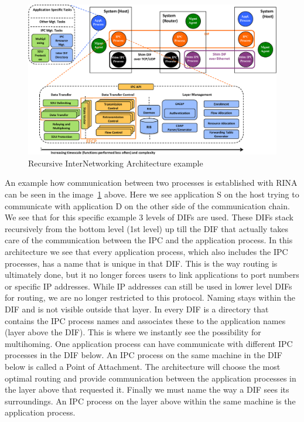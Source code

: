 \npar
\begin{figure}[H]
    \centering
    \includegraphics[width=\textwidth]{figures/referencemodel}
    \caption{Recursive InterNetworking Architecture example \citep{vrijders2014prototyping}} 
    \label{fig:RINAexample}
\end{figure}
\npar
An example how communication between two processes is established with RINA can be seen in the image~\ref{fig:RINAexample} above. Here we see application S on the host trying to communicate with application D on the other side of the communication chain. We see that for this specific example 3 levels of DIFs are used. These DIFs stack recursively from the bottom level (1st level) up till the DIF that actually takes care of the communication between the IPC and the application process. 
\npar
In this architecture we see that every application process, which also includes the IPC processes, has a name that is unique in that DIF. This is the way routing is ultimately done, but it no longer forces users to link applications to port numbers or specific IP addresses. While IP addresses can still be used in lower level DIFs for routing, we are no longer restricted to this protocol. Naming stays within the DIF and is not visible outside that layer. In every DIF is a directory that contains the IPC process names  and associates these to the application names (layer above the DIF). This is where we instantly see the possibility for multihoming. One application process can have communicate with different IPC processes in the DIF below. An IPC process on the same machine in the DIF below is called a Point of Attachment. The architecture will choose the most optimal routing and provide communication between the application processes in the layer above that requested it. Finally we must name the way a DIF sees its surroundings. An IPC process on the layer above within the same machine is the application process. 


